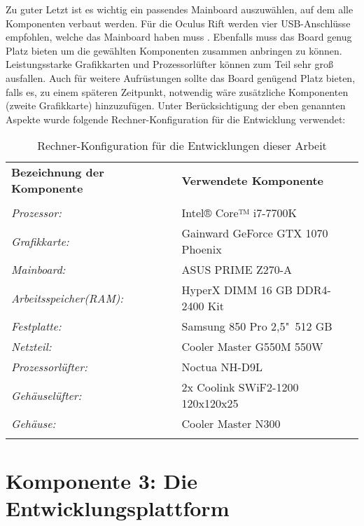 Zu guter Letzt ist es wichtig ein passendes Mainboard auszuwählen, auf dem alle Komponenten verbaut werden. Für die Oculus Rift werden vier USB-Anschlüsse empfohlen, welche das Mainboard haben muss \cite{bib:OculusSpecs}. Ebenfalls muss das Board genug Platz bieten um die gewählten Komponenten zusammen anbringen zu können. Leistungsstarke Grafikkarten und Prozessorlüfter können zum Teil sehr groß ausfallen. Auch für weitere Aufrüstungen sollte das Board genügend Platz bieten, falls es, zu einem späteren Zeitpunkt, notwendig wäre zusätzliche Komponenten (zweite Grafikkarte) hinzuzufügen. Unter Berücksichtigung der eben genannten Aspekte wurde folgende Rechner-Konfiguration für die Entwicklung verwendet:\\  

\begin{table}[h]
 \begin{tabular}{ll}
  \textbf{Bezeichnung der Komponente} & \textbf{Verwendete Komponente}\\
  \\
  
  \textit{Prozessor:} & Intel® Core™ i7-7700K\\
  \textit{Grafikkarte:} & Gainward GeForce GTX 1070 Phoenix\\
  \textit{Mainboard:} & ASUS PRIME Z270-A\\
  \textit{Arbeitsspeicher(RAM):} & HyperX DIMM 16 GB DDR4-2400 Kit\\
  \textit{Festplatte:} & Samsung 850 Pro 2,5"\ 512 GB\\
  \textit{Netzteil:} & Cooler Master G550M 550W\\
  \textit{Prozessorlüfter:} & Noctua NH-D9L\\
  \textit{Gehäuselüfter:} & 2x Coolink SWiF2-1200 120x120x25\\
  \textit{Gehäuse:} & Cooler Master N300\\
\\
 \end{tabular}
 \caption{Rechner-Konfiguration für die Entwicklungen dieser Arbeit}
 \label{tab:Rechnerkonfig}
 \end{table}


\section{Komponente 3: Die Entwicklungsplattform}
\label{sec:VREngine}

